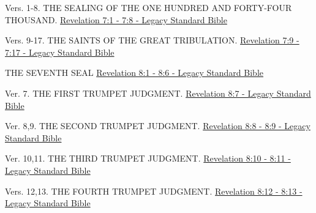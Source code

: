 \documentclass[
  ignorenonframetext,
]{beamer}
\begin{document}
\begin{frame}{7}
\label{section-260}
\begin{block}{Vers. 1-8. THE SEALING OF THE ONE HUNDRED AND FORTY-FOUR
THOUSAND.}
\label{vers.-1-8.-the-sealing-of-the-one-hundred-and-forty-four-thousand.}
\href{https://read.lsbible.org/?q=rev7\%3A1-8}{Revelation 7:1 - 7:8 -
Legacy Standard Bible}
\end{block}

\begin{block}{Vers. 9-17. THE SAINTS OF THE GREAT TRIBULATION.}
\label{vers.-9-17.-the-saints-of-the-great-tribulation.}
\href{https://read.lsbible.org/?q=rev7\%3A9-17}{Revelation 7:9 - 7:17 -
Legacy Standard Bible}
\end{block}
\end{frame}

\begin{frame}{8}
\label{section-261}
\begin{block}{THE SEVENTH SEAL}
\label{the-seventh-seal}
\href{https://read.lsbible.org/?q=rev8\%3A1-6}{Revelation 8:1 - 8:6 -
Legacy Standard Bible}
\end{block}

\begin{block}{Ver. 7. THE FIRST TRUMPET JUDGMENT.}
\label{ver.-7.-the-first-trumpet-judgment.}
\href{https://read.lsbible.org/?q=rev8\%3A7}{Revelation 8:7 - Legacy
Standard Bible}
\end{block}

\begin{block}{Ver. 8,9. THE SECOND TRUMPET JUDGMENT.}
\label{ver.-89.-the-second-trumpet-judgment.}
\href{https://read.lsbible.org/?q=rev8\%3A8-9}{Revelation 8:8 - 8:9 -
Legacy Standard Bible}
\end{block}

\begin{block}{Ver. 10,11. THE THIRD TRUMPET JUDGMENT.}
\label{ver.-1011.-the-third-trumpet-judgment.}
\href{https://read.lsbible.org/?q=rev8\%3A10-11}{Revelation 8:10 - 8:11
- Legacy Standard Bible}
\end{block}

\begin{block}{Vers. 12,13. THE FOURTH TRUMPET JUDGMENT.}
\label{vers.-1213.-the-fourth-trumpet-judgment.}
\href{https://read.lsbible.org/?q=rev8\%3A12-13}{Revelation 8:12 - 8:13
- Legacy Standard Bible}
\end{block}
\end{frame}
\end{document}
